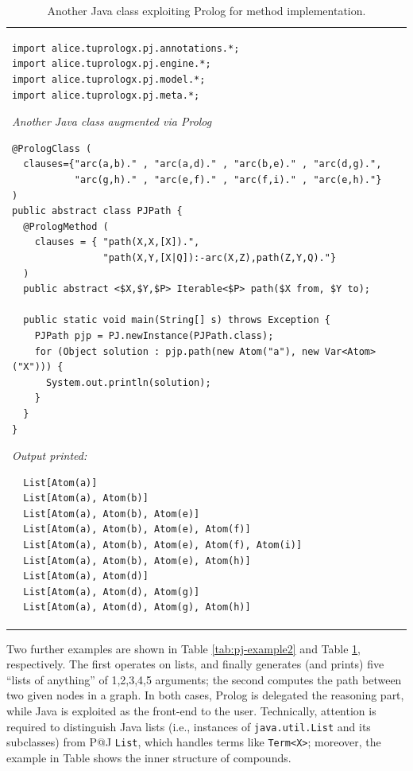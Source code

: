 \begin{table}
{\footnotesize
\begin{tabular}[-1cm]{p{12cm}}
\begin{verbatim}
import alice.tuprologx.pj.annotations.*;
import alice.tuprologx.pj.engine.*;
import alice.tuprologx.pj.model.*;
import alice.tuprologx.pj.meta.*;
\end{verbatim}
\textsf{\emph{Another Java class augmented via Prolog}}
\begin{verbatim}
@PrologClass (
  clauses={"arc(a,b)." , "arc(a,d)." , "arc(b,e)." , "arc(d,g).",
           "arc(g,h)." , "arc(e,f)." , "arc(f,i)." , "arc(e,h)."}
)
public abstract class PJPath {
  @PrologMethod (
    clauses = {	"path(X,X,[X]).",
                "path(X,Y,[X|Q]):-arc(X,Z),path(Z,Y,Q)."}
  )
  public abstract <$X,$Y,$P> Iterable<$P> path($X from, $Y to);

  public static void main(String[] s) throws Exception {
    PJPath pjp = PJ.newInstance(PJPath.class);
    for (Object solution : pjp.path(new Atom("a"), new Var<Atom>("X"))) {
      System.out.println(solution);
    }
  }
}\end{verbatim}
\textsf{\emph{Output printed:}}
\begin{verbatim}
  List[Atom(a)]
  List[Atom(a), Atom(b)]
  List[Atom(a), Atom(b), Atom(e)]
  List[Atom(a), Atom(b), Atom(e), Atom(f)]
  List[Atom(a), Atom(b), Atom(e), Atom(f), Atom(i)]
  List[Atom(a), Atom(b), Atom(e), Atom(h)]
  List[Atom(a), Atom(d)]
  List[Atom(a), Atom(d), Atom(g)]
  List[Atom(a), Atom(d), Atom(g), Atom(h)]
\end{verbatim}
\end{tabular}
}\caption{Another Java class exploiting Prolog for method implementation.}
\label{tab:pj-example3}
\end{table}


Two further examples are shown in Table \ref{tab:pj-example2} and Table \ref{tab:pj-example3}, respectively.
The first operates on lists, and finally generates (and prints) five ``lists of anything'' of 1,2,3,4,5 arguments; the second computes the path between two given nodes in a graph. In both cases, Prolog is delegated the reasoning part, while Java is exploited as the front-end to the user.
Technically, attention is required to distinguish Java lists (i.e., instances of \texttt{java.util.List} and its subclasses) from P@J \texttt{List}, which handles terms like \texttt{Term<X>}; moreover, the example in Table \label{tab:pj-example2} shows the inner structure of compounds.

